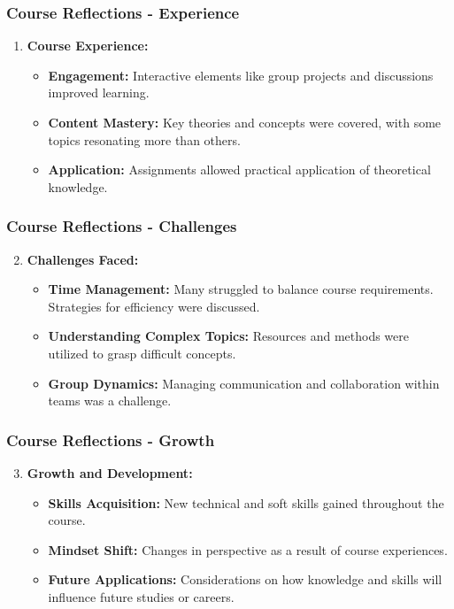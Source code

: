 \documentclass[aspectratio=169]{beamer}
\begin{document}
\begin{frame}[fragile]
    \frametitle{Course Reflections - Experience}
    \begin{enumerate}
        \item \textbf{Course Experience:}
        \begin{itemize}
            \item \textbf{Engagement:} Interactive elements like group projects and discussions improved learning.
            \item \textbf{Content Mastery:} Key theories and concepts were covered, with some topics resonating more than others.
            \item \textbf{Application:} Assignments allowed practical application of theoretical knowledge.
        \end{itemize}
    \end{enumerate}
\end{frame}

\begin{frame}[fragile]
    \frametitle{Course Reflections - Challenges}
    \begin{enumerate}
        \setcounter{enumi}{1}
        \item \textbf{Challenges Faced:}
        \begin{itemize}
            \item \textbf{Time Management:} Many struggled to balance course requirements. Strategies for efficiency were discussed.
            \item \textbf{Understanding Complex Topics:} Resources and methods were utilized to grasp difficult concepts.
            \item \textbf{Group Dynamics:} Managing communication and collaboration within teams was a challenge.
        \end{itemize}
    \end{enumerate}
\end{frame}

\begin{frame}[fragile]
    \frametitle{Course Reflections - Growth}
    \begin{enumerate}
        \setcounter{enumi}{2}
        \item \textbf{Growth and Development:}
        \begin{itemize}
            \item \textbf{Skills Acquisition:} New technical and soft skills gained throughout the course.
            \item \textbf{Mindset Shift:} Changes in perspective as a result of course experiences.
            \item \textbf{Future Applications:} Considerations on how knowledge and skills will influence future studies or careers.
        \end{itemize}
    \end{enumerate}
\end{frame}
\end{document}
